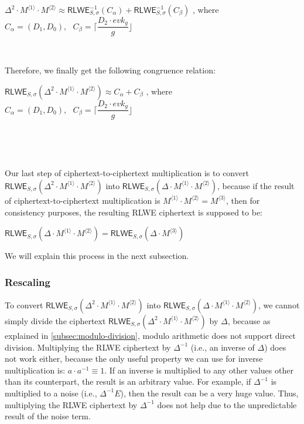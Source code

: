 $\Delta^2 \cdot M^{\langle 1 \rangle} \cdot M^{\langle 2 \rangle} \approx \textsf{RLWE}^{-1}_{S, \sigma}(C_\alpha) + \textsf{RLWE}^{-1}_{S, \sigma}(C_\beta)$ \text{ } , where $C_\alpha = (D_1, D_0), \text{ } C_\beta = \Bigg\lceil\dfrac{D_2 \cdot \mathit{evk_g}}{g}\Bigg\rfloor$

$ $

Therefore, we finally get the following congruence relation:

$\textsf{RLWE}_{S, \sigma}(\Delta^2 \cdot M^{\langle 1 \rangle} \cdot M^{\langle 2 \rangle}) \approx C_\alpha + C_\beta$ \text{ } , where $C_\alpha = (D_1, D_0), \text{ } C_\beta = \Bigg\lceil\dfrac{D_2 \cdot \mathit{evk_g}}{g}\Bigg\rfloor$

$ $

$ $

Our last step of ciphertext-to-ciphertext multiplication is to convert $\textsf{RLWE}_{S, \sigma}(\Delta^2 \cdot M^{\langle 1 \rangle} \cdot M^{\langle 2 \rangle})$ into $\textsf{RLWE}_{S, \sigma}(\Delta \cdot M^{\langle 1 \rangle} \cdot M^{\langle 2 \rangle})$, because if the result of ciphertext-to-ciphertext multiplication is $M^{\langle 1 \rangle} \cdot M^{\langle 2 \rangle} = M^{\langle 3 \rangle}$, then for consistency purposes, the resulting RLWE ciphertext is supposed to be: 

$\textsf{RLWE}_{S, \sigma}(\Delta \cdot M^{\langle 1 \rangle} \cdot M^{\langle 2 \rangle}) = \textsf{RLWE}_{S, \sigma}(\Delta \cdot M^{\langle 3 \rangle})$

We will explain this process in the next subsection. 


\subsubsection{Rescaling}
\label{subsubsec:ckks-mult-cipher-rescale}

To convert $\textsf{RLWE}_{S, \sigma}(\Delta^2 \cdot M^{\langle 1 \rangle} \cdot M^{\langle 2 \rangle})$ into $\textsf{RLWE}_{S, \sigma}(\Delta \cdot M^{\langle 1 \rangle} \cdot M^{\langle 2 \rangle})$, we cannot simply divide the ciphertext $\textsf{RLWE}_{S, \sigma}(\Delta^2 \cdot M^{\langle 1 \rangle} \cdot M^{\langle 2 \rangle})$ by $\Delta$, because as explained in \autoref{subsec:modulo-division}, modulo arithmetic does not support direct division. Multiplying the RLWE ciphertext by $\Delta^{-1}$ (i.e., an inverse of $\Delta$) does not work either, because the only useful property we can use for inverse multiplication is: $a \cdot a^{-1} \equiv 1$. If an inverse is multiplied to any other values other than its counterpart, the result is an arbitrary value. For example, if $\Delta^{-1}$ is multiplied to a noise (i.e., $\Delta^{-1}E$), then the result can be a very huge value. Thus, multiplying the RLWE ciphertext by $\Delta^{-1}$ does not help due to the unpredictable result of the noise term. 

